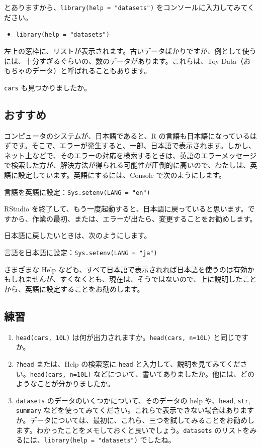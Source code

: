 \documentclass[
  xelatex, ja=standard]{bxjsbook}
\providecommand{\tightlist}{%
  \setlength{\itemsep}{0pt}\setlength{\parskip}{0pt}}
\theoremstyle{definition}
\theoremstyle{definition}
\theoremstyle{definition}
\theoremstyle{definition}
\theoremstyle{remark}
\begin{document}
とありますから、\texttt{library(help\ =\ "datasets")} をコンソールに入力してみてください。

\begin{itemize}
\tightlist
\item
  \texttt{library(help\ =\ "datasets")}
\end{itemize}

左上の窓枠に、リストが表示されます。古いデータばかりですが、例として使うには、十分すぎるぐらいの、数のデータがあります。これらは、Toy Data（おもちゃのデータ）と呼ばれることもあります。

\texttt{cars} も見つかりましたか。

\hypertarget{ux304aux3059ux3059ux3081}{%
\subsection{おすすめ}\label{ux304aux3059ux3059ux3081}}

コンピュータのシステムが、日本語であると、R の言語も日本語になっているはずです。そこで、エラーが発生すると、一部、日本語で表示されます。しかし、ネット上などで、そのエラーの対応を検索するときは、英語のエラーメッセージで検索した方が、解決方法が得られる可能性が圧倒的に高いので、わたしは、英語に設定しています。英語にするには、Console で次のようにします。

言語を英語に設定：\texttt{Sys.setenv(LANG\ =\ "en")}

RStudio を終了して、もう一度起動すると、日本語に戻っていると思います。ですから、作業の最初、または、エラーが出たら、変更することをお勧めします。

日本語に戻したいときは、次のようにします。

言語を日本語に設定：\texttt{Sys.setenv(LANG\ =\ "ja")}

さまざまな Help なども、すべて日本語で表示されれば日本語を使うのは有効かもしれませんが、すくなくとも、現在は、そうではないので、上に説明したことから、英語に設定することをお勧めします。

\hypertarget{ux7df4ux7fd2-1}{%
\subsection{練習}\label{ux7df4ux7fd2-1}}

\begin{enumerate}
\def\labelenumi{\arabic{enumi}.}
\tightlist
\item
  \texttt{head(cars,\ 10L)} は何が出力されますか。\texttt{head(cars,\ n=10L)} と同じですか。
\item
  \texttt{?head} または、Help の検索窓に \texttt{head} と入力して、説明を見てみてください。\texttt{head(cars,\ n=10L)} などについて、書いてありましたか。他には、どのようなことが分かりましたか。
\item
  \texttt{datasets} のデータのいくつかについて、そのデータの help や、\texttt{head}, \texttt{str}, \texttt{summary} などを使ってみてください。これらで表示できない場合はありますか。データについては、最初に、これら、三つを試してみることをお勧めします。わかったことをメモしておくと良いでしょう。\texttt{datasets} のリストをみるには、\texttt{library(help\ =\ "datasets")} でしたね。
\end{enumerate}
\end{document}
